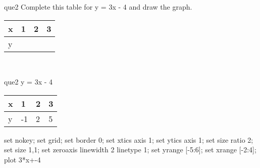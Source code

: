 \documentclass[13.5pt, varwidth=true]{beamer}
\begin{document}
\begin{frame}[shrink=19,fragile]
	\begin{beamercolorbox}[rounded=true, left, shadow=true,wd=14.8cm]{que2}
		 Complete this table for y = 3x - 4 and draw the graph. \\[0.3cm] \renewcommand{\arraystretch}{1.2}\begin{tabular}{|C|C|C|C|} \hline x & 1 & 2 & 3 \\ \hline y & & & \\ \hline \end{tabular}\\[0.3cm]
	\end{beamercolorbox}
\end{frame}
\begin{frame}[shrink=19,fragile]
	\begin{beamercolorbox}[rounded=true, left, shadow=true,wd=14.8cm]{que2}
		y = 3x - 4\renewcommand{\arraystretch}{1.2}\begin{tabular}{|C|C|C|C|} \hline x & 1 & 2 & 3 \\ \hline y & -1 & 2 & 5\\ \hline \end{tabular}\begin{gnuplot}[terminal=pdf] set nokey; set grid; set border 0; set xtics axis 1; set ytics axis 1; set size ratio 2; set size 1,1; set zeroaxis linewidth 2 linetype 1; set yrange [-5:6]; set xrange [-2:4]; plot 3*x+-4 \end{gnuplot}
	\end{beamercolorbox}
\end{frame}
\end{document}
